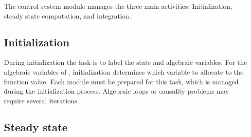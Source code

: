 The control system module manages the three main activities:
Initialization, steady state computation, and integration.

\subsection{Initialization}

During initialization the task is to label the state and algebraic variables.
For the algebraic variables of , initialization determines which
variable to allocate to the function value.
Each module must be prepared for this task, which is managed during the
initialization process.
Algebraic loops or causality problems may require several iterations.

\subsection{Steady state}

